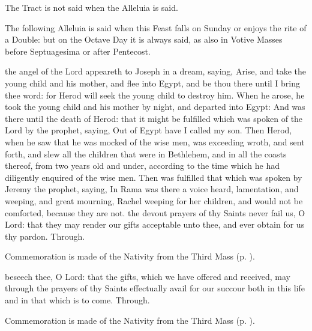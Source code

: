 \begin{rubric}
     The Tract is not said when the Alleluia is said.
\end{rubric}
\begin{rubric}
    The following Alleluia is said when this Feast falls on Sunday or enjoys the rite of a  Double: but on the Octave Day it is always said, as also in Votive Masses before Septuagesima or after Pentecost.
\end{rubric}
 the angel of the Lord appeareth to Joseph in a dream, saying, Arise, and take the young child and his mother, and flee into Egypt, and be thou there until I bring thee word: for Herod will seek the young child to destroy him. When he arose, he took the young child and his mother by night, and departed into Egypt: And was there until the death of Herod: that it might be fulfilled which was spoken of the Lord by the prophet, saying, Out of Egypt have I called my son. Then Herod, when he saw that he was mocked of the wise men, was exceeding wroth, and sent forth, and slew all the children that were in Bethlehem, and in all the coasts thereof, from two years old and under, according to the time which he had diligently enquired of the wise men. Then was fulfilled that which was spoken by Jeremy the prophet, saying, In Rama was there a voice heard, lamentation, and weeping, and great mourning, Rachel weeping for her children, and would not be comforted, because they are not.
\secret
{} the devout prayers of thy Saints never fail us, O Lord: that they may render our gifts acceptable unto thee, and ever obtain for us thy pardon. Through.
\begin{rubric}
    Commemoration is made of the Nativity from the Third Mass (p. \pageref{NativityMassIIISecret}).
\end{rubric}
\postcommunion
{} beseech thee, O Lord: that the gifts, which we have offered and received, may through the prayers of thy Saints effectually avail for our succour both in this life and in that which is to come. Through.
\begin{rubric}
    Commemoration is made of the Nativity from the Third Mass (p. \pageref{NativityMassIIIPostcommunion}).
\end{rubric}

